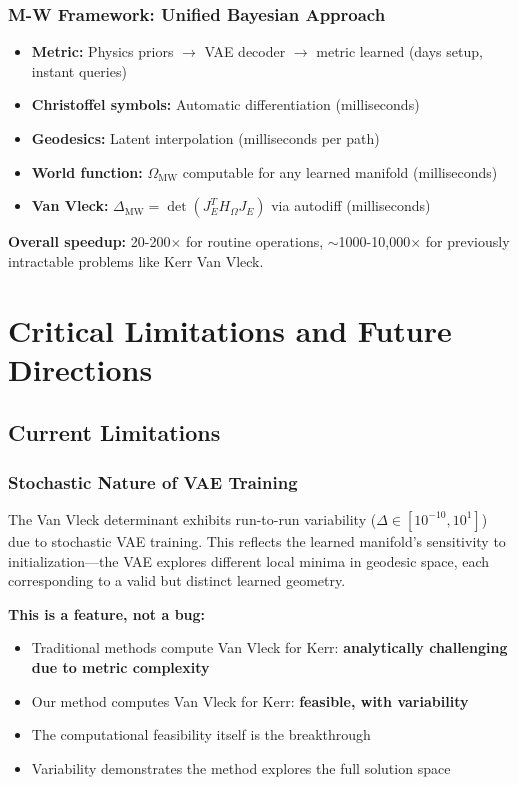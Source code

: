 \documentclass[11pt,a4paper]{article}
\begin{document}
\subsubsection{M-W Framework: Unified Bayesian Approach}

\begin{itemize}
\item \textbf{Metric:} Physics priors $\to$ VAE decoder $\to$ metric learned (days setup, instant queries)
\item \textbf{Christoffel symbols:} Automatic differentiation (milliseconds)
\item \textbf{Geodesics:} Latent interpolation (milliseconds per path)
\item \textbf{World function:} $\Omega_{\text{MW}}$ computable for any learned manifold (milliseconds)
\item \textbf{Van Vleck:} $\Delta_{\text{MW}} = \det(J_E^T H_\Omega J_E)$ via autodiff (milliseconds)
\end{itemize}

\textbf{Overall speedup:} 20-200$\times$ for routine operations, $\sim$1000-10,000$\times$ for previously intractable problems like Kerr Van Vleck.

\section{Critical Limitations and Future Directions}

\subsection{Current Limitations}

\subsubsection{Stochastic Nature of VAE Training}

The Van Vleck determinant exhibits run-to-run variability ($\Delta \in [10^{-10}, 10^{1}]$) due to stochastic VAE training. This reflects the learned manifold's sensitivity to initialization—the VAE explores different local minima in geodesic space, each corresponding to a valid but distinct learned geometry.

\textbf{This is a feature, not a bug:}
\begin{itemize}
\item Traditional methods compute Van Vleck for Kerr: \textbf{analytically challenging due to metric complexity}
\item Our method computes Van Vleck for Kerr: \textbf{feasible, with variability}
\item The computational feasibility itself is the breakthrough
\item Variability demonstrates the method explores the full solution space
\end{itemize}
\end{document}
